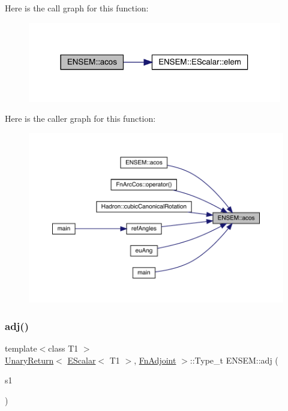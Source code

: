 Here is the call graph for this function\+:\nopagebreak
\begin{figure}[H]
\begin{center}
\leavevmode
\includegraphics[width=314pt]{d4/dca/group__escalar_gac8e90d16773622bd9971db55f0c125c9_cgraph}
\end{center}
\end{figure}
Here is the caller graph for this function\+:
\nopagebreak
\begin{figure}[H]
\begin{center}
\leavevmode
\includegraphics[width=350pt]{d4/dca/group__escalar_gac8e90d16773622bd9971db55f0c125c9_icgraph}
\end{center}
\end{figure}
\mbox{\label{group__escalar_ga51071562edd203962f48e4b44f0c0a0c}} 
\subsubsection{\texorpdfstring{adj()}{adj()}}
{\footnotesize\ttfamily template$<$class T1 $>$ \\
\mbox{\hyperlink{structENSEM_1_1UnaryReturn}{Unary\+Return}}$<$ \mbox{\hyperlink{classENSEM_1_1EScalar}{E\+Scalar}}$<$ T1 $>$, \mbox{\hyperlink{structENSEM_1_1FnAdjoint}{Fn\+Adjoint}} $>$\+::Type\+\_\+t E\+N\+S\+E\+M\+::adj (\begin{DoxyParamCaption}\item[{const \mbox{\hyperlink{classENSEM_1_1EScalar}{E\+Scalar}}$<$ T1 $>$ \&}]{s1 }\end{DoxyParamCaption})\hspace{0.3cm}{\ttfamily [inline]}}


